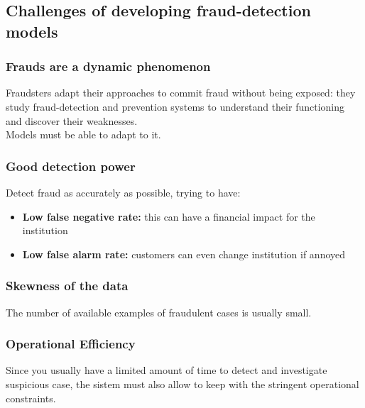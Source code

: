    \subsection{Challenges of developing fraud-detection models}
        \subsubsection{Frauds are a dynamic phenomenon}
            Fraudsters adapt their approaches to commit fraud without being exposed: they study fraud-detection and prevention systems to understand their functioning and discover their weaknesses.\\
            Models must be able to adapt to it.
        \subsubsection{Good detection power}
            Detect fraud as accurately as possible, trying to have:
            \begin{itemize}
                \item \textbf{Low false negative rate:} this can have a financial impact for the institution
                \item \textbf{Low false alarm rate:} customers can even change institution if annoyed
            \end{itemize}
        \subsubsection{Skewness of the data}
            The number of available examples of fraudulent cases is usually small.
        \subsubsection{Operational Efficiency}
            Since you usually have a limited amount of time to detect and investigate suspicious case, the sistem must also allow to keep with the stringent operational constraints.